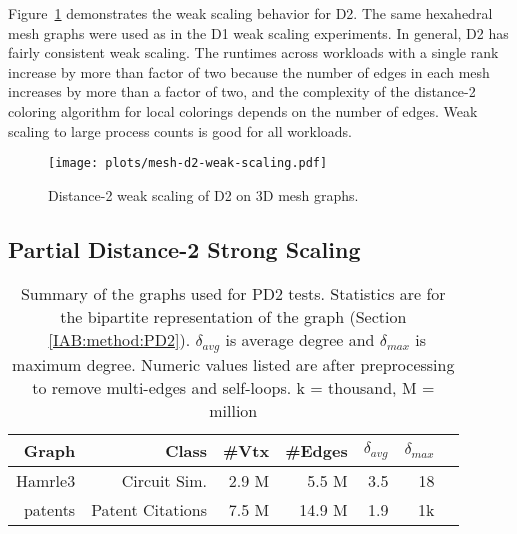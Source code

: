 Figure~\ref{IAB:meshd2weak} demonstrates the weak scaling behavior for D2.
The same hexahedral mesh graphs were used as in the D1 weak scaling experiments.
In general, D2 has fairly consistent weak scaling.
The runtimes across workloads with a single rank increase by more than factor of two because the number of edges in each mesh increases by more than a factor of two, and the complexity of the distance-2 coloring algorithm for local colorings depends on the number of edges.
Weak scaling to large process counts is good for all workloads.
\begin{figure}[h]
  \centering
  \caption{Distance-2 weak scaling of D2 on 3D mesh graphs.}
  \texttt{[image: plots/mesh-d2-weak-scaling.pdf]}
  \label{IAB:meshd2weak}
\end{figure}



\subsection{Partial Distance-2 Strong Scaling}

\begin{table}[!t]
  \small
  \centering
  \caption{Summary of the graphs used for PD2 tests. Statistics are for the bipartite representation of the graph (Section ~\ref{IAB:method:PD2}).  $\delta_{avg}$ is average degree and $\delta_{max}$ is maximum degree. Numeric values listed are after preprocessing to remove multi-edges and self-loops. k = thousand, M = million}
  \begin{tabular}{|r|r|r|r|r|r|r|}
    \hline
    Graph	& Class	&	\#Vtx	& \#Edges	& $\delta_{avg}$ & $\delta_{max}$ \\
    \hline
    Hamrle3	&Circuit Sim. &2.9 M	&5.5 M		& 3.5		 & 18		  \\
    patents	&Patent Citations &7.5 M	&14.9 M		& 1.9		 & 1k		  \\
    \hline
  \end{tabular}\\
  \label{IAB:tab:pd2graphs}
\end{table}

